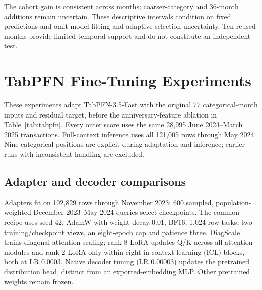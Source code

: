 \documentclass[conference]{IEEEtran}
\begin{document}
\begin{table}[!ht]
\caption{Paired recent-window RMSE sensitivity (SGD); negative values favor the first candidate. Input counts follow Table~\ref{tab:tabpfn}. Intervals use 5,000 circular three-month-block resamples of ten months, seed 42. Sampled months retain all their rows; pooled squared errors and counts determine each RMSE.}
\label{tab:paired}
\centering\small

\end{table}

\noindent The cohort gain is consistent across months; coarser-category and 36-month additions remain uncertain. These descriptive intervals condition on fixed predictions and omit model-fitting and adaptive-selection uncertainty. Ten reused months provide limited temporal support and do not constitute an independent test.

\clearpage
\section{TabPFN Fine-Tuning Experiments}\label{app:finetuning}
\begingroup\small
These experiments adapt TabPFN-3.5-Fast with the original 77 categorical-month inputs and residual target, before the anniversary-feature ablation in Table~\ref{tab:tabpfn}. Every outer score uses the same 28,995 June 2024--March 2025 transactions. Full-context inference uses all 121,005 rows through May 2024. Nine categorical positions are explicit during adaptation and inference; earlier runs with inconsistent handling are excluded.

\subsection{Adapter and decoder comparisons}
Adapters fit on 102,829 rows through November 2023; 600 sampled, population-weighted December 2023--May 2024 queries select checkpoints. The common recipe uses seed 42, AdamW with weight decay 0.01, BF16, 1,024-row tasks, two training/checkpoint views, an eight-epoch cap and patience three. DiagScale trains diagonal attention scaling; rank-8 LoRA updates Q/K across all attention modules and rank-2 LoRA only within eight in-context-learning (ICL) blocks, both at LR 0.0003. Native decoder tuning (LR 0.00003) updates the pretrained distribution head, distinct from an exported-embedding MLP. Other pretrained weights remain frozen.

\begin{table}[!ht]
\caption{TabPFN adaptation on the recent development window (SGD). Differences use the frozen control with the same inference-view count. LR denotes learning rate. The two matched DiagScale loss trials share LR 0.01 and a revised, typed one-view checkpoint rule.}
\label{tab:finetuning}
\centering\small

\end{table}
\end{document}
